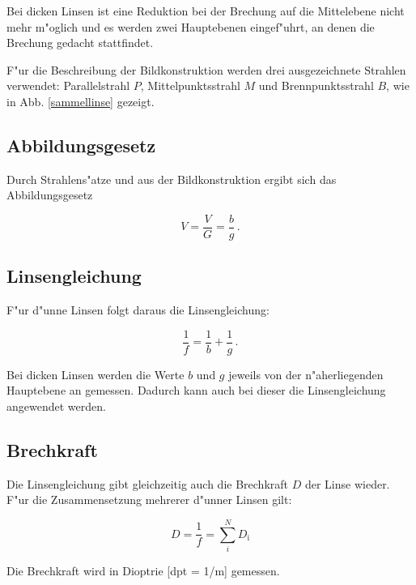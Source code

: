 	Bei dicken Linsen ist eine Reduktion bei der Brechung auf die Mittelebene nicht mehr m"oglich und es werden zwei Hauptebenen eingef"uhrt, an denen die Brechung gedacht stattfindet.

	F"ur die Beschreibung der Bildkonstruktion werden drei ausgezeichnete Strahlen verwendet:
	Parallelstrahl $P$, Mittelpunktsstrahl $M$ und Brennpunktsstrahl $B$, wie in Abb. \eqref{sammellinse} gezeigt.

	\subsection{Abbildungsgesetz} %
	\label{sub:abbildungsgesetz}
	
	Durch Strahlens"atze und aus der Bildkonstruktion ergibt sich das Abbildungsgesetz

	\begin{equation}
		\label{abbildungsmassstab}
		V = \frac{V}{G} = \frac{b}{g}\, .
	\end{equation}

	\subsection{Linsengleichung} %
	\label{sub:linsengleichung}
	
	F"ur d"unne Linsen folgt daraus die Linsengleichung:

	\begin{equation}
		\label{linsengleichung}
		\frac{1}{f} = \frac{1}{b} + \frac{1}{g}\, .
	\end{equation}

	Bei dicken Linsen werden die Werte $b$ und $g$ jeweils von der n"aherliegenden Hauptebene an gemessen. Dadurch kann auch bei dieser die Linsengleichung angewendet werden.

	\subsection{Brechkraft} %
	\label{sub:brechkraft}
	
	Die Linsengleichung gibt gleichzeitig auch die Brechkraft $D$ der Linse wieder. F"ur die Zusammensetzung mehrerer d"unner Linsen gilt:

	\begin{equation}
		D = \frac{1}{f} = \sum_i^N D_\mathrm{i} \label{brechkraft}
	\end{equation}

	Die Brechkraft wird in Dioptrie [dpt = 1/m] gemessen.

